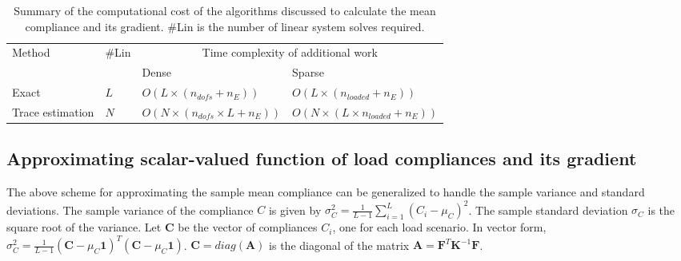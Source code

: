       \begin{table}
       \centering
       \caption{Summary of the computational cost of the algorithms discussed to calculate the mean compliance and its gradient. \#Lin is the number of linear system solves required.}
       \begin{tabular}{| m{3cm} | m{0.7cm} | m{4cm} | m{5cm}|} 
        \hline
        \multirow{2}{3em}{Method} & \multirow{2}{2em}{\#Lin} & \multicolumn{2}{c|}{Time complexity of additional work} \\\cline{3-4}
        & & Dense & Sparse \\
        \hline
        \hline
        Exact & \(L\) & \(O(L \times (n_{dofs} + n_E))\) & \(O(L \times (n_{loaded} + n_E))\) \\
        \hline
        Trace estimation & \(N\) & \(O(N \times (n_{dofs} \times L + n_E))\) & \(O(N \times (L \times n_{loaded} + n_E))\) \\
        \hline
       \end{tabular}
       \label{tab:perf_mean}
      \end{table}

  \subsection{Approximating scalar-valued function of load compliances and its gradient} \label{sec:proposed_risk}

    The above scheme for approximating the sample mean compliance can be generalized to handle the sample variance and standard deviations. The sample variance of the compliance $C$ is given by $\sigma_C^2 = \frac{1}{L-1} \sum_{i=1}^L (C_i - \mu_C)^2$. The sample standard deviation $\sigma_C$ is the square root of the variance. Let $\bm{C}$ be the vector of compliances $C_i$, one for each load scenario. In vector form, $\sigma_C^2 = \frac{1}{L-1} (\bm{C} - \mu_C \bm{1})^T (\bm{C} - \mu_C \bm{1})$. $\bm{C} = diag(\bm{A})$ is the diagonal of the matrix $\bm{A} = \bm{F}^T \bm{K}^{-1} \bm{F}$.

